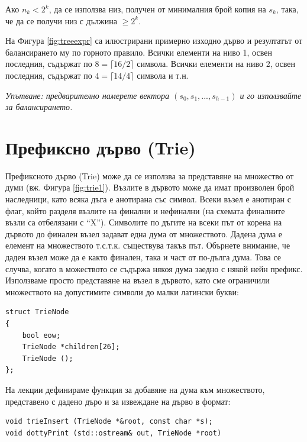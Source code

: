 \begin{enumerate}[resume]
\begin{enumerate}[label=\alph*)]
    Ако $n_k < 2^k$, да се използва низ, получен от минималния брой копия на $s_k$, така, че да се получи низ с дължина $\geq 2^k$.
  \end{enumerate}

  На Фигура \ref{fig:treeexpr} са илюстрирани примерно изходно дърво и резултатът от балансирането му по горното правило. Всички елементи на ниво 1, освен последния, съдържат по $8=\lceil{16/2}\rceil$ символа. Всички елементи на ниво 2, освен последния, съдържат по $4=\lceil{14/4}\rceil$ символа и т.н.


  \emph{Упътване: предварително намерете вектора $(s_0,s_1,...,s_{h-1})$ и го използвайте за балансирането.}
\end{enumerate}

\pagebreak

\section{Префиксно дърво (Trie)}



\begin{mdframed}[hidealllines=true,backgroundcolor=gray!20]
Префиксното дърво (Trie) може да се използва за представяне на множество от думи (вж. Фигура \ref{fig:trie1}). Възлите в дървото може да имат произволен брой наследници, като всяка дъга е анотирана със символ. Всеки възел е анотиран с флаг, който разделя възлите на финални и нефинални (на схемата финалните възли са отбелязани с ``X''). Символите по дъгите на всеки път от корена на дървото до финален възел задават една дума от множеството. Дадена дума е елемент на множеството т.с.т.к. съществува такъв път. Обърнете внимание, че даден възел може да е както финален, така и част от по-дълга дума. Това се случва, когато в можеството се съдържа някоя дума заедно с някой нейн префикс.
Използваме просто представяне на възел в дървото, като сме ограничили множеството на допустимите символи до малки латински букви:

\begin{verbatim}
struct TrieNode
{
    bool eow;
    TrieNode *children[26];
    TrieNode ();
};
\end{verbatim}
На лекции дефинираме функция за добавяне на дума към множеството, представено с дадено дъро и за извеждане на дърво в  формат:
\begin{verbatim}
void trieInsert (TrieNode *&root, const char *s);
void dottyPrint (std::ostream& out, TrieNode *root)

\end{verbatim}
\end{mdframed}

